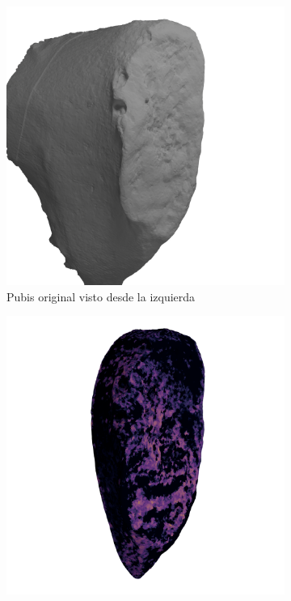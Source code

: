 \begin{figure}[p]
    \centering
    \begin{subfigure}{0.4\textwidth}
        \centering
        \includegraphics[width=\linewidth]{../../scripts/misc/grad-cam/53-L/53-L_original_left.png}
        \caption{Pubis original visto desde la izquierda}
        \label{fig5:og_pubis}
    \end{subfigure}
    \begin{subfigure}{0.4\textwidth}
        \centering
        \includegraphics[width=\linewidth]{../../scripts/misc/grad-cam/53-L/53-L_af_left.png}

\end{subfigure}
\end{figure}
